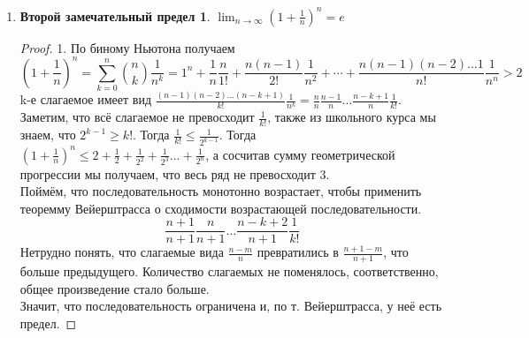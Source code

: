 \documentclass{article}
\theoremstyle{plain}
\def\letus{%
    \mathord{\setbox0=\hbox{$\exists$}%
             \hbox{\kern 0.125\wd0%
                   \vbox to \ht0{%
                      \hrule width 0.75\wd0%
                      \vfill%
                      \hrule width 0.75\wd0}%
                   \vrule height \ht0%
                   \kern 0.125\wd0}%
           }%
}
\begin{document}
\begin{enumerate}
\begin{th13*}
        \end{th13*}
        \begin{proof}
            Рассмотрим возрастающую и ограниченную последовательность (для убывающей и ограниченной снизу аналогично).
            $$\letus\,A = \sup_{n \in \mathbb{N}}{{x_n}} \implies \forall\,x_n\le A \text{ и } \forall\,\varepsilon > 0\; \exists\, N \in \mathbb{N}: x_N > A - \varepsilon$$
            Т. к. последовательность возрастает $\forall\, n \in \mathbb{N}\rightarrow x_{n + 1} \ge x_n$  и $x_n > A - \varepsilon.$
            $$A - \varepsilon < x_n \le A < A + \varepsilon \implies |x_n - A| <\varepsilon\; \forall\, n > N$$
            $$\implies \forall\, \varepsilon\; \exists\, N \in \mathbb{N}: \forall\, n > N \rightarrow |x_n - A| < \varepsilon$$
        \end{proof}
        \item \newtheorem*{e*}{Второй замечательный предел}
        \begin{e*}
            $\lim_{n \to \infty}{(1 + \frac{1}{n})}^{n} = e$
        \end{e*}
        \begin{proof}
            1. По биному Ньютона получаем 
            $$(1 + \frac{1}{n})^{n} = \sum_{k = 0}^{n}{\binom{n}{k}\frac{1}{n ^{k}}} = 1^n + \frac{1}{n}\frac{n}{1!} + \frac{n(n - 1)}{2!}\frac{1}{n^2} + \cdots + \frac{n(n - 1)(n - 2)...1}{n!}\frac{1}{n^n} > 2$$
            k-е слагаемое имеет вид $\frac{(n - 1)(n - 2)...(n - k + 1)}{k!}\frac{1}{n^k} = \frac{n}{n}\frac{n - 1}{n}...\frac{n - k + 1}{n}\frac{1}{k!}.$ Заметим, что всё слагаемое не превосходит $\frac{1}{k!}$, также из школьного курса мы знаем, что $2^{k - 1} \ge k!$. Тогда $\frac{1}{k!} \le \frac{1}{2^{k - 1}}$. Тогда $(1 + \frac{1}{n})^n \le 2 + \frac{1}{2} + \frac{1}{2^2} + \frac{1}{2^3} ... + \frac{1}{2^n}$, а сосчитав сумму геометрической прогрессии мы получаем, что весь ряд не превосходит 3. \\
            Поймём, что последовательность монотонно возрастает, чтобы применить теоремму Вейерштрасса о сходимости возрастающей последовательности.
            $$\frac{n + 1}{n + 1}\frac{n}{n + 1}...\frac{n - k + 2}{n + 1}\frac{1}{k!}$$
            Нетрудно понять, что слагаемые вида $\frac{n - m}{n}$ превратились в $\frac{n + 1 - m}{n + 1}$, что больше предыдущего. Количество слагаемых не поменялось, соответственно, общее произведение стало больше. \\
            Значит, что последовательность ограничена и, по т. Вейерштрасса, у неё есть предел.
        \end{proof}

\end{enumerate}
\end{document}
